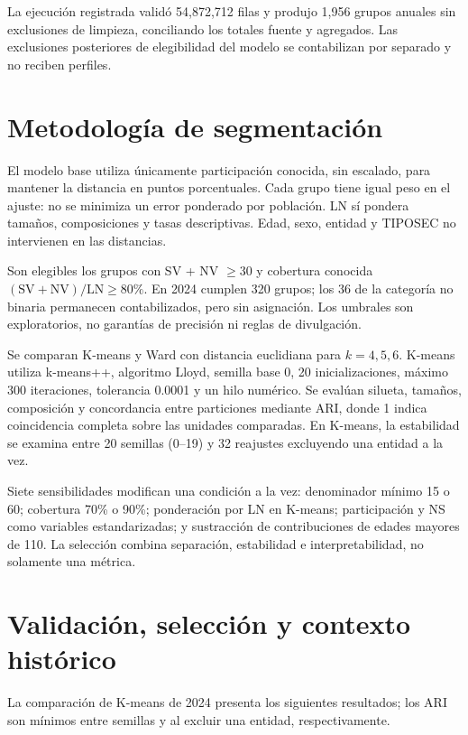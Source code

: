 \documentclass[11pt]{article}
\begin{document}
La ejecución registrada validó 54,872,712 filas y produjo 1,956 grupos anuales sin exclusiones de limpieza, conciliando los totales fuente y agregados. Las exclusiones posteriores de elegibilidad del modelo se contabilizan por separado y no reciben perfiles.

\section{Metodología de segmentación}

El modelo base utiliza únicamente participación conocida, sin escalado, para mantener la distancia en puntos porcentuales. Cada grupo tiene igual peso en el ajuste: no se minimiza un error ponderado por población. LN sí pondera tamaños, composiciones y tasas descriptivas. Edad, sexo, entidad y TIPOSEC no intervienen en las distancias.

Son elegibles los grupos con SV + NV $\geq 30$ y cobertura conocida $(\mathrm{SV}+\mathrm{NV})/\mathrm{LN}\geq80\%$. En 2024 cumplen 320 grupos; los 36 de la categoría no binaria permanecen contabilizados, pero sin asignación. Los umbrales son exploratorios, no garantías de precisión ni reglas de divulgación.

Se comparan K-means y Ward con distancia euclidiana para $k=4,5,6$. K-means utiliza k-means++, algoritmo Lloyd, semilla base 0, 20 inicializaciones, máximo 300 iteraciones, tolerancia 0.0001 y un hilo numérico. Se evalúan silueta, tamaños, composición y concordancia entre particiones mediante ARI, donde 1 indica coincidencia completa sobre las unidades comparadas. En K-means, la estabilidad se examina entre 20 semillas (0--19) y 32 reajustes excluyendo una entidad a la vez.

Siete sensibilidades modifican una condición a la vez: denominador mínimo 15 o 60; cobertura 70\% o 90\%; ponderación por LN en K-means; participación y NS como variables estandarizadas; y sustracción de contribuciones de edades mayores de 110. La selección combina separación, estabilidad e interpretabilidad, no solamente una métrica.

\section{Validación, selección y contexto histórico}

La comparación de K-means de 2024 presenta los siguientes resultados; los ARI son mínimos entre semillas y al excluir una entidad, respectivamente.
\end{document}
